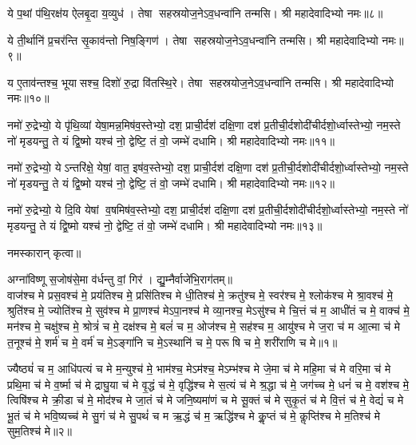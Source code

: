 ये प॒थां प॑थि॒रक्ष॑य ऐलबृ॒दा य॒व्युध॑। तेषा सहस्रयोज॒ने\-ऽव॒धन्वा॑नि तन्मसि। श्री महादेवादिभ्यो नमः॥८॥

ये ती॒र्थानि॑ प्र॒चर॑न्ति सृ॒काव॑न्तो निष॒ङ्गिण॑। तेषा सहस्रयोज॒ने\-ऽव॒धन्वा॑नि तन्मसि। श्री महादेवादिभ्यो नमः॥९॥

य ए॒ताव॑न्तश्च॒ भूयासश्च॒ दिशो॑ रु॒द्रा वि॑तस्थि॒रे। तेषा सहस्रयोज॒ने\-ऽव॒धन्वा॑नि तन्मसि। श्री महादेवादिभ्यो नमः॥१०॥

नमो॑ रु॒द्रेभ्यो॒ ये पृ॑थि॒व्यां येषा॒मन्न॒मिष॑व॒स्तेभ्यो॒ दश॒ प्राची॒र्दश॑ दक्षि॒णा दश॑ प्र॒तीची॒र्दशो\-दी॑चीर्दशो॒र्ध्वास्तेभ्यो॒ नम॒स्ते नो॑ मृडयन्तु॒ ते यं द्वि॒ष्मो यश्च॑ नो॒ द्वेष्टि॒ तं वो॒ जम्भे॑ दधामि। श्री महादेवादिभ्यो नमः॥११॥ 

नमो॑ रु॒द्रेभ्यो॒ येऽन्तरि॑क्षे॒ येषां॒ वात॒ इष॑व॒स्तेभ्यो॒ दश॒ प्राची॒र्दश॑ दक्षि॒णा दश॑ प्र॒तीची॒र्दशो\-दी॑चीर्दशो॒र्ध्वास्तेभ्यो॒ नम॒स्ते नो॑ मृडयन्तु॒ ते यं द्वि॒ष्मो यश्च॑ नो॒ द्वेष्टि॒ तं वो॒ जम्भे॑ दधामि। श्री महादेवादिभ्यो नमः॥१२॥ 

नमो॑ रु॒द्रेभ्यो॒ ये दि॒वि येषां व॒\ar षमिष॑व॒स्तेभ्यो॒ दश॒ प्राची॒र्दश॑ दक्षि॒णा दश॑ प्र॒तीची॒र्दशो\-दी॑चीर्दशो॒र्ध्वास्तेभ्यो॒ नम॒स्ते नो॑ मृडयन्तु॒ ते यं द्वि॒ष्मो यश्च॑ नो॒ द्वेष्टि॒ तं वो॒ जम्भे॑ दधामि। श्री महादेवादिभ्यो नमः॥१३॥ 

नमस्कारान् कृत्वा॥

{\small \closesection}


अग्ना॑विष्णू स॒जोष॑से॒मा व॑र्धन्तु वां॒ गिर॑। द्यु॒म्नैर्वाजे॑भि॒राग॑तम्॥ \\
वाज॑श्च मे प्रस॒वश्च॑ मे॒ प्रय॑तिश्च मे॒ प्रसि॑तिश्च मे धी॒तिश्च॑ मे॒ क्रतु॑श्च मे॒ स्वर॑श्च मे॒ श्लोक॑श्च मे श्रा॒वश्च॑ मे॒ श्रुति॑श्च मे॒ ज्योति॑श्च मे॒ सुव॑श्च मे प्रा॒णश्च॑ मेऽपा॒नश्च॑ मे व्या॒नश्च॒ मेऽसु॑श्च मे चि॒त्तं च॑ म॒ आधी॑तं च मे॒ वाक्च॑ मे॒ मन॑श्च मे॒ चक्षु॑श्च मे॒ श्रोत्रं॑ च मे॒ दक्ष॑श्च मे॒ बलं॑ च म॒ ओज॑श्च मे॒ सह॑श्च म॒ आयु॑श्च मे ज॒रा च॑ म आ॒त्मा च॑ मे त॒नूश्च॑ मे॒ शर्म॑ च मे॒ वर्म॑ च मे॒ऽङ्गा॑नि च मे॒ऽस्थानि॑ च मे॒ परूषि च मे॒ शरी॑राणि च मे॥१॥ 

ज्यैष्ठ्यं॑ च म॒ आधि॑पत्यं च मे म॒न्युश्च॑ मे॒ भाम॑श्च॒ मेऽम॑श्च॒ मेऽम्भ॑श्च मे जे॒मा च॑ मे महि॒मा च॑ मे वरि॒मा च॑ मे प्रथि॒मा च॑ मे व॒र्ष्मा च॑ मे द्राघु॒या च॑ मे वृ॒द्धं च॑ मे॒ वृद्धि॑श्च मे स॒त्यं च॑ मे श्र॒द्धा च॑ मे॒ जग॑च्च मे॒ धनं॑ च मे॒ वश॑श्च मे॒ त्विषि॑श्च मे क्री॒डा च॑ मे॒ मोद॑श्च मे जा॒तं च॑ मे जनि॒ष्यमा॑णं च मे सू॒क्तं च॑ मे सुकृ॒तं च॑ मे वि॒त्तं च॑ मे॒ वेद्यं॑ च मे भू॒तं च॑ मे भवि॒ष्यच्च॑ मे सु॒गं च॑ मे सु॒पथं॑ च म ऋ॒द्धं च॑ म॒ ऋद्धि॑श्च मे कॢ॒प्तं च॑ मे॒ कॢप्ति॑श्च मे म॒तिश्च॑ मे सुम॒तिश्च॑ मे॥२॥ 

